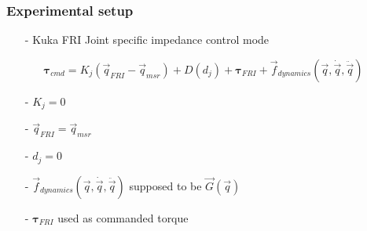 \begin{frame}
  \frametitle{Experimental setup}
  \begin{itemize}
  \item[-] Kuka FRI Joint specific impedance control mode
    \begin{itemize}
    \item[] $\boldsymbol{\tau}_{cmd} = K_j(\vec{q}_{FRI} - \vec{q}_{msr}) + D(d_{j}) + \boldsymbol{\tau}_{FRI} + \vec{f}_{dynamics}(\vec{q}, \dot{\vec{q}}, \ddot{\vec{q}})$
    \end{itemize}
  \item[-] $K_j = 0$
  \item[-] $\vec{q}_{FRI} = \vec{q}_{msr}$
  \item[-] $d_{j} = 0$
  \item[-] $\vec{f}_{dynamics}(\vec{q}, \dot{\vec{q}}, \ddot{\vec{q}})$ supposed to be $\vec{G}(\vec{q})$
  \item[-] $\boldsymbol{\tau}_{FRI}$ used as commanded torque
  \end{itemize}
\end{frame}

